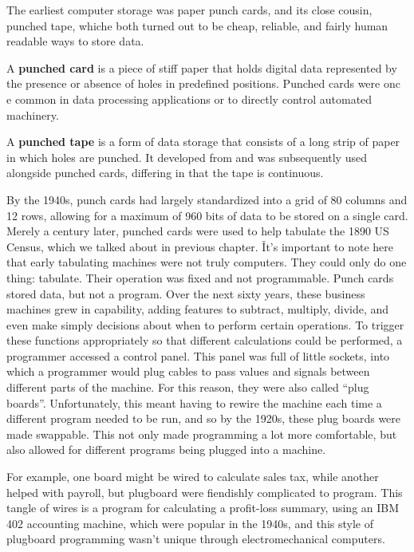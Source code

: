 The earliest computer storage was paper punch cards, and its close cousin, punched tape, whiche both turned out to be
cheap, reliable, and fairly human readable ways to store data.

A \textbf{punched card} is a piece of stiff paper that holds digital data represented by the presence or absence of
holes in predefined positions. Punched cards were onc e common in data processing applications or to directly control
automated machinery.
\ed

A \textbf{punched tape} is a form of data storage that consists of a long strip of paper in which holes are punched.
It developed from and was subsequently used alongside punched cards, differing in that the tape is continuous.
\ed


By the 1940s, punch cards had largely standardized into a grid of 80 columns and 12 rows, allowing for a maximum of
960 bits of data to be stored on a single card. Merely a century later, punched cards were used to help tabulate the
1890 US Census, which we talked about in previous chapter. \v

It's important to note here that early tabulating machines were not truly computers. They could only do one thing:
tabulate. Their operation was fixed and not programmable. Punch cards stored data, but not a program. Over the next
sixty years, these business machines grew in capability, adding features to subtract, multiply, divide, and even make
simply decisions about when to perform certain operations. To trigger these functions appropriately so that different
calculations could be performed, a programmer accessed a control panel. This panel was full of little sockets, into
which a programmer would plug cables to pass values and signals between different parts of the machine. For this
reason, they were also called ``plug boards''. Unfortunately, this meant having to rewire the machine each time a
different program needed to be run, and so by the 1920s, these plug boards were made swappable. This not only made
programming a lot more comfortable, but also allowed for different programs being plugged into a machine.

\be
For example, one board might be wired to calculate sales tax, while another helped with payroll, but plugboard were
fiendishly complicated to program. This tangle of wires is a program for calculating a profit-loss summary, using an
IBM 402 accounting machine, which were popular in the 1940s, and this style of plugboard programming wasn't unique
through electromechanical computers.
\ee


